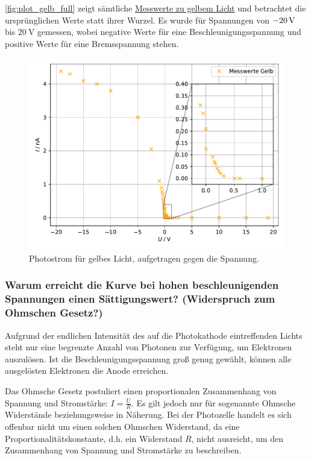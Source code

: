 \autoref{fig:plot_gelb_full} zeigt sämtliche \hyperref[tab:werte_gelb]{Messwerte zu gelbem Licht}
und betrachtet die ursprünglichen Werte statt ihrer Wurzel.
Es wurde für Spannungen von $\SI{- 20}{\volt}$ bis $\SI{20}{\volt}$ gemessen,
wobei negative Werte für eine Beschleunigungsspannung
und positive Werte für eine Bremsspannung stehen.


\begin{figure}[H]
  \centering
  \includegraphics[width=\textwidth]{build/plot_gelb_full.pdf}
  \caption{Photostrom für gelbes Licht, aufgetragen gegen die Spannung.}
  \label{fig:plot_gelb_full}
\end{figure}

\subsubsection*{Warum erreicht die Kurve bei hohen beschleunigenden Spannungen einen Sättigungswert? (Widerspruch zum Ohmschen Gesetz?)}

Aufgrund der endlichen Intensität des auf die Photokathode eintreffenden Lichts
steht nur eine begrenzte Anzahl von Photonen zur Verfügung, um Elektronen auszulösen.
Ist die Beschleunigungsspannung groß genug gewählt,
können alle ausgelösten Elektronen die Anode erreichen.

Das Ohmsche Gesetz postuliert einen proportionalen Zusammenhang von Spannung und Stromstärke: $I = \frac{U}{R}$.
Es gilt jedoch nur für sogenannte Ohmsche Widerstände beziehungsweise in Näherung.
Bei der Photozelle handelt es sich offenbar nicht um einen solchen Ohmschen Widerstand,
da eine Proportionalitätskonstante, d.h. ein Widerstand $R$, nicht ausreicht,
um den Zusammenhang von Spannung und Stromstärke zu beschreiben.

